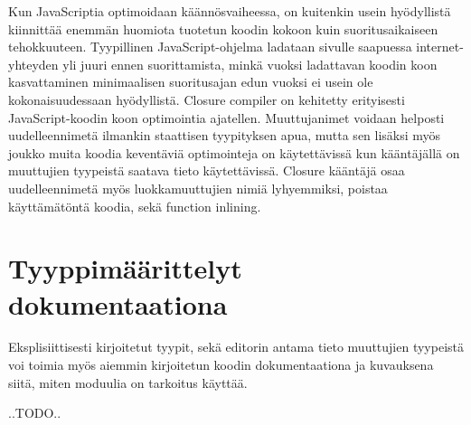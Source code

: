 Kun JavaScriptia optimoidaan käännösvaiheessa, on kuitenkin usein hyödyllistä
kiinnittää enemmän huomiota tuotetun koodin kokoon kuin suoritusaikaiseen
tehokkuuteen. Tyypillinen JavaScript-ohjelma ladataan sivulle saapuessa
internet-yhteyden yli juuri ennen suorittamista, minkä vuoksi ladattavan
koodin koon kasvattaminen minimaalisen suoritusajan edun vuoksi ei usein ole
kokonaisuudessaan hyödyllistä. Closure compiler on kehitetty erityisesti
JavaScript-koodin koon optimointia ajatellen. Muuttujanimet voidaan helposti
uudelleennimetä ilmankin staattisen tyypityksen apua, mutta sen lisäksi myös
joukko muita koodia keventäviä optimointeja on käytettävissä kun kääntäjällä
on muuttujien tyypeistä saatava tieto käytettävissä. Closure kääntäjä osaa
uudelleennimetä myös luokkamuuttujien nimiä lyhyemmiksi, poistaa
käyttämätöntä koodia, sekä function inlining.

\section{Tyyppimäärittelyt dokumentaationa}
Eksplisiittisesti kirjoitetut tyypit, sekä editorin antama tieto muuttujien
tyypeistä voi toimia myös aiemmin kirjoitetun koodin dokumentaationa ja
kuvauksena siitä, miten moduulia on tarkoitus käyttää.

..TODO..